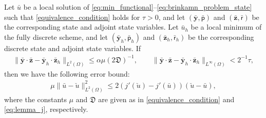 \documentclass[final]{siamart0216}
\begin{document}
\begin{theorem} 
Let $\bar{u}$ be a local solution of \eqref{eq:min_functional}--\eqref{eq:brinkamn_problem_state} such that \eqref{equivalence_condition} holds for $\tau > 0$, and let 
$(\bar{\mathbf{y}},\bar{\mathsf{p}})$ and $(\bar{\mathbf{z}},\bar{\mathsf{r}})$ be the corresponding state and adjoint state variables. Let $\bar{u}_{h}$ be a local minimum of the fully discrete scheme, and let $(\bar{\mathbf{y}}_h,\bar{\mathsf{p}}_h)$ and $(\bar{\mathbf{z}}_h,\bar{\mathsf{r}}_h)$ be the corresponding discrete state and adjoint state variables. If
\begin{align}\label{eq:bound_aux}
\|\bar{\mathbf{y}}\cdot \bar{\mathbf{z}}-\bar{\mathbf{y}}_h\cdot \bar{\mathbf{z}}_h\|_{L^2(\Omega)}\leq \alpha \mu (2\mathfrak{D})^{-1},
\qquad
\|\bar{\mathbf{y}}\cdot \bar{\mathbf{z}}-\bar{\mathbf{y}}_h\cdot \bar{\mathbf{z}}_h\|_{L^{\infty}(\Omega)} < 2^{-1} \tau,
\end{align}
then we have the following error bound:
\begin{align}\label{eq:bound_aux_j_final}
\mu \|\bar{u}-\breve{u}\|_{L^2(\Omega)}^2 \leq 2(j'(\breve{u})-j'(\bar{u}))(\breve{u}-\bar{u}),
\end{align}
where the constants $\mu$ and $\mathfrak{D}$ are given as in \eqref{equivalence_condition} and \eqref{eq:lemma_j}, respectively.
\end{theorem}
\end{document}
